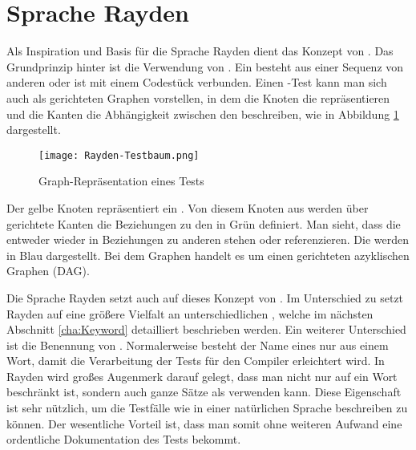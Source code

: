 
\section{Sprache Rayden}

Als Inspiration und Basis für die Sprache Rayden dient das Konzept von . Das Grundprinzip hinter  ist die Verwendung von . Ein  besteht aus einer Sequenz von anderen  oder ist mit einem Codestück verbunden. Einen -Test kann man sich auch als gerichteten Graphen vorstellen, in dem die Knoten die  repräsentieren und die Kanten die Abhängigkeit zwischen den  beschreiben, wie in Abbildung \ref{fig:test-graph} dargestellt.

\begin{figure}[h]
\centering
\texttt{[image: Rayden-Testbaum.png]}
\caption{Graph-Repräsentation eines Tests}
\label{fig:test-graph}
\end{figure}

\SuperPar
Der gelbe Knoten repräsentiert ein . Von diesem Knoten aus werden über gerichtete Kanten die Beziehungen zu den  in Grün definiert. Man sieht, dass die  entweder wieder in Beziehungen zu anderen  stehen oder  referenzieren. Die  werden in Blau dargestellt. Bei dem Graphen handelt es um einen gerichteten azyklischen Graphen (DAG).

\SuperPar
Die Sprache Rayden setzt auch auf dieses Konzept von . Im Unterschied zu  setzt Rayden auf eine größere Vielfalt an unterschiedlichen , welche im nächsten Abschnitt \ref{cha:Keyword} detailliert beschrieben werden. Ein weiterer Unterschied ist die Benennung von . Normalerweise besteht der Name eines  nur aus einem Wort, damit die Verarbeitung der Tests für den Compiler erleichtert wird. In Rayden wird großes Augenmerk darauf gelegt, dass man nicht nur auf ein Wort beschränkt ist, sondern auch ganze Sätze als  verwenden kann. Diese Eigenschaft ist sehr nützlich, um die Testfälle wie in einer natürlichen Sprache beschreiben zu können. Der wesentliche Vorteil ist, dass man somit ohne weiteren Aufwand eine ordentliche Dokumentation des Tests bekommt.

